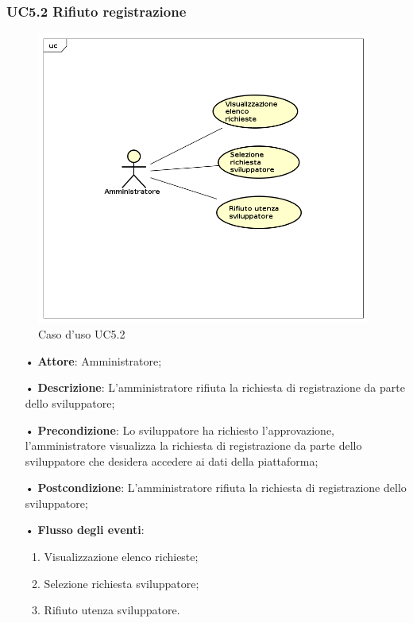 \subsubsection{UC5.2 Rifiuto registrazione}

\begin{figure}[H]
\centering
\includegraphics[width=11cm]{img/UC52.png} 
\caption{Caso d'uso UC5.2}
\end{figure}


\begin{itemize}
\item[•] \textbf{Attore}: Amministratore;

\item[•] \textbf{Descrizione}: L’amministratore rifiuta la richiesta di registrazione da parte dello sviluppatore;

\item[•] \textbf{Precondizione}: Lo sviluppatore ha richiesto l’approvazione, l’amministratore visualizza la richiesta di registrazione da parte dello sviluppatore che desidera accedere ai dati della piattaforma;

\item[•] \textbf{Postcondizione}: L’amministratore rifiuta la richiesta di registrazione dello sviluppatore;

\item[•] \textbf{Flusso degli eventi}:

\begin{enumerate}

\item Visualizzazione elenco richieste;

\item Selezione richiesta sviluppatore;

\item Rifiuto utenza sviluppatore.

\end{enumerate}
\end{itemize}
